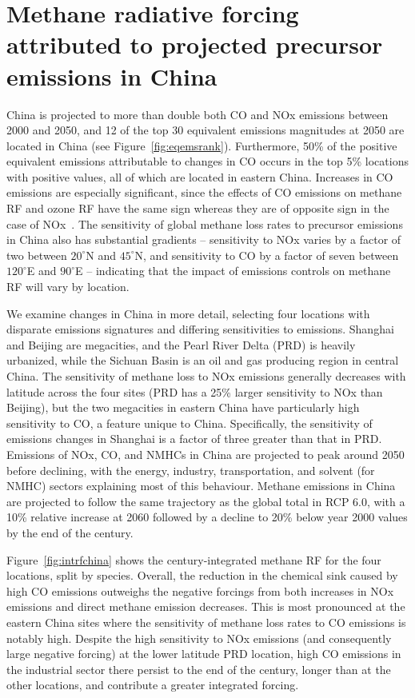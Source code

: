 \section{Methane radiative forcing attributed to projected precursor emissions in China}
\label{sec:china}
China is projected to more than double both CO and NOx emissions between 2000 and 2050, and 12 of the top 30 equivalent emissions magnitudes at 2050 are located in China (see Figure~\ref{fig:eqemsrank}). Furthermore, 50\% of the positive equivalent emissions attributable to changes in CO occurs in the top 5\% locations with positive values, all of which are located in eastern China. Increases in CO emissions are especially significant, since the effects of CO emissions on methane RF and ozone RF have the same sign whereas they are of opposite sign in the case of NOx~\citep{ref:myhre2013}. The sensitivity of global methane loss rates to precursor emissions in China also has substantial gradients -- sensitivity to NOx varies by a factor of two between $20^{\circ}$N and $45^{\circ}$N, and sensitivity to CO by a factor of seven between $120^{\circ}$E and $90^{\circ}$E -- indicating that the impact of emissions controls on methane RF will vary by location. 

We examine changes in China in more detail, selecting four locations with disparate emissions signatures and differing sensitivities to emissions. Shanghai and Beijing are megacities, and the Pearl River Delta (PRD) is heavily urbanized, while the Sichuan Basin is an oil and gas producing region in central China. The sensitivity of methane loss to NOx emissions generally decreases with latitude across the four sites (PRD has a 25\% larger sensitivity to NOx than Beijing), but the two megacities in eastern China have particularly high sensitivity to CO, a feature unique to China. Specifically, the sensitivity of  emissions changes in Shanghai is a factor of three greater than that in PRD. Emissions of NOx, CO, and NMHCs in China are projected to peak around 2050 before declining, with the energy, industry, transportation, and solvent (for NMHC) sectors explaining most of this behaviour. Methane emissions in China are projected to follow the same trajectory as the global total in RCP 6.0, with a 10\% relative increase at 2060 followed by a decline to 20\% below year 2000 values by the end of the century.

Figure~\ref{fig:intrfchina} shows the century-integrated methane RF for the four locations, split by species. Overall, the reduction in the chemical sink caused by high CO emissions outweighs the negative forcings from both increases in NOx emissions and direct methane emission decreases. This is most pronounced at the eastern China sites where the sensitivity of methane loss rates to CO emissions is notably high. Despite the high sensitivity to NOx emissions (and consequently large negative forcing) at the lower latitude PRD location, high CO emissions in the industrial sector there persist to the end of the century, longer than at the other locations, and contribute a greater integrated forcing.